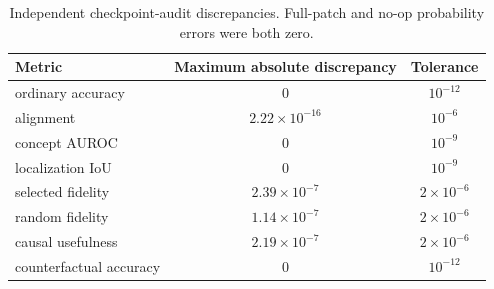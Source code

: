 \begin{table}[h]
\centering
\small
\begin{tabular}{lcc}
\toprule
Metric & Maximum absolute discrepancy & Tolerance \\
\midrule
ordinary accuracy & 0 & $10^{-12}$ \\
alignment & $2.22\times10^{-16}$ & $10^{-6}$ \\
concept AUROC & 0 & $10^{-9}$ \\
localization IoU & 0 & $10^{-9}$ \\
selected fidelity & $2.39\times10^{-7}$ & $2\times10^{-6}$ \\
random fidelity & $1.14\times10^{-7}$ & $2\times10^{-6}$ \\
causal usefulness & $2.19\times10^{-7}$ & $2\times10^{-6}$ \\
counterfactual accuracy & 0 & $10^{-12}$ \\
\bottomrule
\end{tabular}
\caption{Independent checkpoint-audit discrepancies. Full-patch and no-op probability errors were both zero.}
\label{tab:audit}
\end{table}